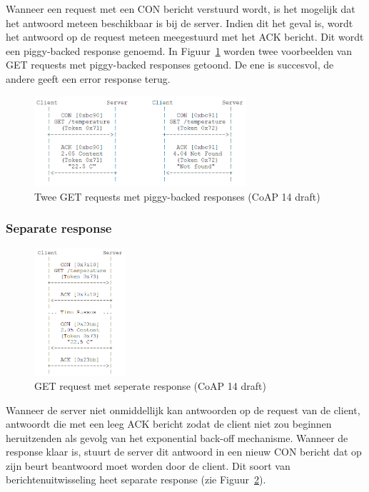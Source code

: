 Wanneer een request met een CON bericht verstuurd wordt, is het mogelijk dat het antwoord meteen beschikbaar is bij de server. Indien dit het geval is, wordt het antwoord op de request meteen meegestuurd met het ACK bericht. Dit wordt een piggy-backed response genoemd. In Figuur~\ref{fig:CoAPPiggyBacked} worden twee voorbeelden van GET requests met piggy-backed responses getoond. De ene is succesvol, de andere geeft een error response terug.
\begin{figure}[h]
\vspace{10pt}
\centering
\includegraphics[width=0.7\textwidth]{fig/CoAPPiggyBacked}
\caption{Twee GET requests met piggy-backed responses (CoAP 14 draft)}
\label{fig:CoAPPiggyBacked}
\vspace{-20pt}
\end{figure}

\newpage

\subsubsection{Separate response} \label{separate}

\begin{figure}
\vspace{-40pt}
\includegraphics[width=0.3\textwidth]{fig/CoAPSeperateResponse}
\vspace{-30pt}
\caption{GET request met seperate response (CoAP 14 draft)}
\label{fig:SeparateResponse}
\vspace{-100pt}
\end{figure}
Wanneer de server niet onmiddellijk kan antwoorden op de request van de client, antwoordt die met een leeg ACK bericht zodat de client niet zou beginnen heruitzenden als gevolg van het exponential back-off mechanisme. Wanneer de response klaar is, stuurt de server dit antwoord in een nieuw CON bericht dat op zijn beurt beantwoord moet worden door de client. Dit soort van berichtenuitwisseling heet separate response (zie Figuur~\ref{fig:SeparateResponse}).
\\
\\
\\

